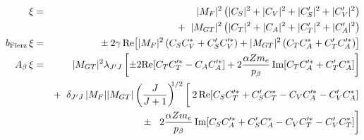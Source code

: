 %
%
%
\begin{eqnarray}
    \xi &=& 
    	|M_F|^2    \left( |C_S|^2 + |C_V|^2 + |C_S^\prime|^2 + |C_V^\prime|^2 \right) 
		\nonumber \\ && + \;\; 
		|M_{GT}|^2 \left( |C_T|^2 + |C_A|^2 + |C_T^\prime|^2 + |C_A^\prime|^2 \right)
	\label{eq:jtw_xi} \\
    \bFierz \, \xi &=& \pm \: 2\gamma \, \textrm{Re}\!\left[ |M_F|^2 \left( C_S C_V^* + C_S^\prime C_V^{\prime *} \right) + |M_{GT}|^2 \left( C_T C_A^* + C_T^{\prime} C_A^{\prime *} \right) \right] 
    \label{eq:jtw_bxi} \\
    \Abeta \, \xi &=& |M_{GT}|^2 \lambda_{J^\prime J} \left[ \pm 2 \textrm{Re}\!\left[ C_T C_T^{\prime *} - C_A C_A^{\prime *} \right] + 2 \frac{\alpha Z \me }{\pbeta} \,\textrm{Im}\!\left[ C_T C_A^{\prime *} + C_T^\prime C_A^* \right] \right] 
		\nonumber \\ && + \;\; 
		\delta_{J^\prime J} \, |M_F| |M_{GT}| \left( \frac{J}{J+1} \right)^{\!\!\! 1/2} \left[ \phantom{\frac{1}{1}\!\!\!} 2 \,\textrm{Re} \! \left[ C_S C_T^{\prime *} +  C_S^\prime C_T^* - C_V C_A^{\prime *} - C_V^\prime C_A^* \right] 
		\right.
		\nonumber \\ && \pm \;\;
		\left.
		2 \frac{\alpha Z \me }{\pbeta} \,\textrm{Im}\!\left[ C_S C_A^{\prime *} + C_S^\prime C_A^* - C_V C_T^{\prime *} -C_V^\prime C_T^* \right] \right]
	\label{eq:jtw_Abetaxi}
\end{eqnarray}
%
%